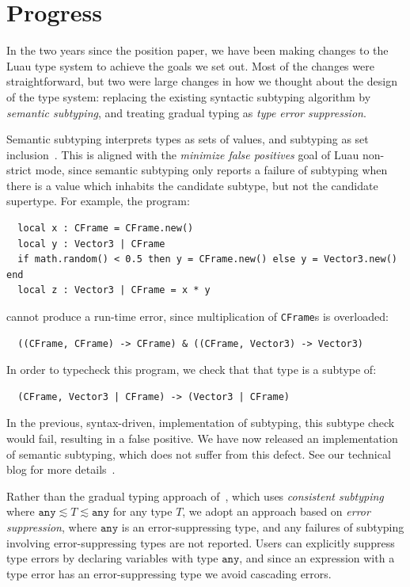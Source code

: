 \documentclass[acmsmall]{acmart}
\newcommand{\ANY}{\mathtt{any}}
\begin{document}
\section{Progress}

In the two years since the position paper, we have been making changes
to the Luau type system to achieve the goals we set out. Most of the
changes were straightforward, but two were large changes in how we
thought about the design of the type system: replacing the existing
syntactic subtyping algorithm by \emph{semantic subtyping}, and
treating gradual typing as \emph{type error suppression}.

Semantic subtyping
interprets types as sets of values, and subtyping as set
inclusion~\cite{GF05:GentleIntroduction}. This is aligned with the
\emph{minimize false positives} goal of Luau non-strict mode, since
semantic subtyping only reports a failure of subtyping when there is a
value which inhabits the candidate subtype, but not the candidate
supertype.
For example, the program:
\begin{verbatim}
  local x : CFrame = CFrame.new()
  local y : Vector3 | CFrame
  if math.random() < 0.5 then y = CFrame.new() else y = Vector3.new() end
  local z : Vector3 | CFrame = x * y
\end{verbatim}
cannot produce a run-time error, since multiplication of \verb|CFrame|s is overloaded:
\begin{verbatim}
  ((CFrame, CFrame) -> CFrame) & ((CFrame, Vector3) -> Vector3)
\end{verbatim}
In order to typecheck this program, we check that that type is a subtype of:
\begin{verbatim}
  (CFrame, Vector3 | CFrame) -> (Vector3 | CFrame)
\end{verbatim}
In the previous, syntax-driven, implementation of subtyping, this subtype check  would fail, resulting in a false positive.
We have now released an implementation of semantic subtyping, which does not suffer from this defect.
See our technical blog for more details~\cite{Jef22:SemanticSubtyping}.

Rather than the gradual typing approach
of~\cite{ST07:GradualTyping}, which uses \emph{consistent
subtyping} where $\ANY \lesssim T \lesssim \ANY$ for any type $T$, we
adopt an approach based on \emph{error suppression}, where $\ANY$ is
an error-suppressing type, and any failures of subtyping involving
error-suppressing types are not reported. Users can explicitly
suppress type errors by declaring variables with type $\ANY$, and
since an expression with a type error has an error-suppressing type we
avoid cascading errors.
\end{document}
